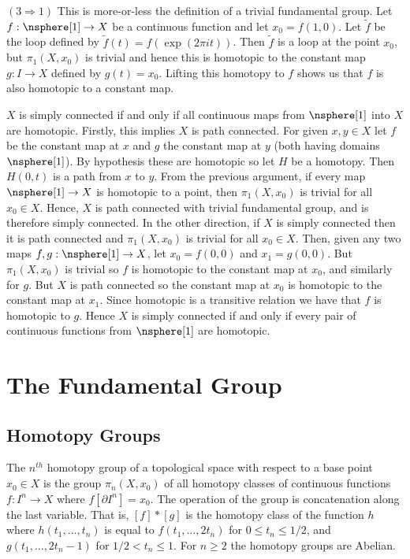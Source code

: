 \documentclass{book}                                                           %
\begin{document}
\begin{solution}
            $(3\Rightarrow{1})$ This is more-or-less the definition of a trivial
            fundamental group. Let $f:\nsphere[1]\rightarrow{X}$ be a continuous
            function and let $x_{0}=f(1,0)$. Let $\tilde{f}$ be the loop defined by
            $\tilde{f}(t)=f(\exp(2\pi{i}t))$. Then $\tilde{f}$ is a loop at the
            point $x_{0}$, but $\pi_{1}(X,x_{0})$ is trivial and hence this is
            homotopic to the constant map $g:I\rightarrow{X}$ defined by
            $g(t)=x_{0}$. Lifting this homotopy to $f$ shows us that $f$ is also
            homotopic to a constant map.
            \par\hfill\par
            $X$ is simply connected if and only if all continuous maps from
            $\nsphere[1]$ into $X$ are homotopic. Firstly, this implies $X$ is
            path connected. For given $x,y\in{X}$ let $f$ be the constant map at
            $x$ and $g$ the constant map at $y$ (both having domains $\nsphere[1]$).
            By hypothesis these are homotopic so let $H$ be a homotopy. Then
            $H(0,t)$ is a path from $x$ to $y$. From the previous argument, if every
            map $\nsphere[1]\rightarrow{X}$ is homotopic to a point, then
            $\pi_{1}(X,x_{0})$ is trivial for all $x_{0}\in{X}$. Hence, $X$ is path
            connected with trivial fundamental group, and is therefore simply
            connected. In the other direction, if $X$ is simply connected then it is
            path connected and $\pi_{1}(X,x_{0})$ is trivial for all $x_{0}\in{X}$.
            Then, given any two maps $f,g:\nsphere[1]\rightarrow{X}$, let
            $x_{0}=f(0,0)$ and $x_{1}=g(0,0)$. But $\pi_{1}(X,x_{0})$ is trivial so
            $f$ is homotopic to the constant map at $x_{0}$, and similarly for
            $g$. But $X$ is path connected so the constant map at $x_{0}$ is
            homotopic to the constant map at $x_{1}$. Since homotopic is a
            transitive relation we have that $f$ is homotopic to $g$. Hence $X$ is
            simply connected if and only if every pair of continuous functions
            from $\nsphere[1]$ are homotopic.
        \end{solution}
    \chapter{The Fundamental Group}
        \section{Homotopy Groups}
            The $n^{th}$ homotopy group of a topological space with respect to a
            base point $x_{0}\in{X}$ is the group $\pi_{n}(X,x_{0})$ of all
            homotopy classes of continuous functions $f:I^{n}\rightarrow{X}$
            where $f[\partial{I}^{n}]=x_{0}$. The operation of the group is
            concatenation along the last variable. That is,
            $[f]*[g]$ is the homotopy class of the function
            $h$ where $h(t_{1},\dots,t_{n})$ is equal to
            $f(t_{1},\dots,2t_{n})$ for $0\leq{t}_{n}\leq{1}/2$, and
            $g(t_{1},\dots,2t_{n}-1)$ for $1/2<t_{n}\leq{1}$. For $n\geq{2}$ the
            homotopy groups are Abelian.
\end{document}
